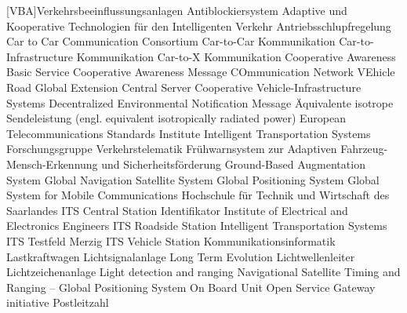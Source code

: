 
[VBA]{Verkehrsbeeinflussungsanlagen}
 {Antiblockiersystem}
 {Adaptive und Kooperative Technologien für den Intelligenten Verkehr}
 {Antriebsschlupfregelung}
 {Car to Car Communication Consortium}
 {Car-to-Car Kommunikation}
 {Car-to-Infra\-structure Kommunikation}
 {Car-to-X Kommunikation}
 {Cooperative Awareness Basic Service}
 {Cooperative Awareness Message}
 {COmmunication Network VEhicle Road Global Extension}
 {Central Server}
 {Cooperative Vehicle-Infrastructure Systems}
 {Decentralized Environmental Notification Message}
 {Äquivalente isotrope Sendeleistung (engl. equivalent isotropically radiated power)}
 {European Telecommunications Standards Institute Intelligent Transportation Systems}
 {Forschungsgruppe Verkehrstelematik}
 {Frühwarnsystem zur Adaptiven Fahrzeug-Mensch-Erkennung und Sicherheitsförderung}
 {Ground-Based Augmentation System}
 {Global Navigation Satellite System}
 {Global Positioning System}
 {Global System for Mobile Communications}
 {Hochschule für Technik und Wirtschaft des Saarlandes}
 {ITS Central Station}
 {Identifikator}
 {Institute of Electrical and Electronics Engineers}
 {\ac{ITS} Roadside Station}
 {Intelligent Transportation Systems}
 {ITS Testfeld Merzig}
 {ITS Vehicle Station}
 {Kommunikationsinformatik}
 {Lastkraftwagen}
 {Lichtsignalanlage}
 {Long Term Evolution}
 {Lichtwellenleiter}
 {Lichtzeichenanlage}
 {Light detection and ranging}
 {Navigational Satellite Timing and Ranging – Global Positioning System}
 {On Board Unit}
 {Open Service Gateway initiative}
 {Postleitzahl}
